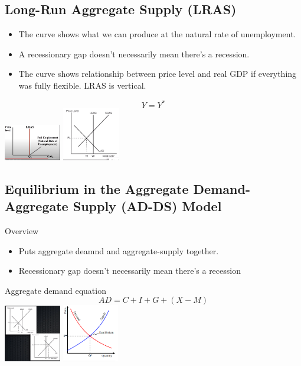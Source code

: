 \documentclass[8pt]{beamer}
\begin{document}
  \begin{frame}
	\section{Long-Run Aggregate Supply (LRAS)}
	\begin{itemize}
		\item The curve shows what we can produce at the natural rate of unemployment.
		\item A recessionary gap doesn't necessarily mean there's a recession.
		\item The curve shows relationship between price level and real GDP if
		everything was fully flexible. LRAS is vertical. 
	\end{itemize}
	$$Y = Y^*$$
	\includegraphics[width=2.5cm]{2021-10-12-12-18-10.png}
	\includegraphics[width=2.5cm]{2021-10-12-12-58-09.png}
  \end{frame}
  \begin{frame}
	\section{Equilibrium in the Aggregate Demand-Aggregate Supply (AD-DS) Model}
	Overview
	\begin{itemize}
		\item Puts aggregate deamnd and aggregate-supply together.
		\item Recessionary gap doesn't necessarily mean there's a recession
	\end{itemize}
	Aggregate demand equation
	$$AD = C + I + G + (X - M)$$
	\includegraphics[width=2.5cm]{2021-10-12-12-45-18.png}
	\includegraphics[height=2.5cm]{2021-10-12-13-03-25.png}
  \end{frame}
\end{document}
